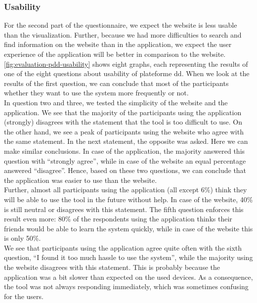 \subsubsection{Usability}
For the second part of the questionnaire, we expect the website is less usable than the visualization. Further, because we had more difficulties to search and find information on the website than in the application, we expect the user experience of the application will be better in comparison to the website. \\

\autoref{fig:evaluation-pdd-usability} shows eight graphs, each representing the results of one of the eight questions about usability of plateforme dd. When we look at the results of the first question, we can conclude that most of the participants whether they want to use the system more frequently or not.\\

In question two and three, we tested the simplicity of the website and the application. We see that the majority of the participants using the application (strongly) disagrees with the statement that the tool is too difficult to use. On the other hand, we see a peak of participants using the website who agree with the same statement. In the next statement, the opposite was asked. Here we can make similar conclusions. In case of the application, the majority answered this question with ``strongly agree'', while in case of the website an equal percentage answered ``disagree''. Hence, based on these two questions, we can conclude that the application was easier to use than the website.\\

Further, almost all participants using the application (all except 6\%) think they will be able to use the tool in the future without help. In case of the website, 40\% is still neutral or disagrees with this statement. The fifth question enforces this result even more: 80\% of the respondents using the application thinks their friends would be able to learn the system quickly, while in case of the website this is only 50\%.\\

We see that participants using the application agree quite often with the sixth question, ``I found it too much hassle to use the system'', while the majority using the website disagrees with this statement. This is probably because the application was a bit slower than expected on the used devices. As a consequence, the tool was not always responding immediately, which was sometimes confusing for the users.\\

